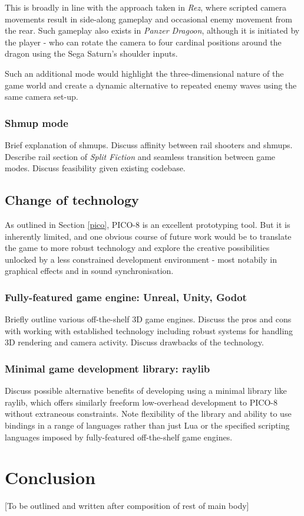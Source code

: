 \documentclass[11pt]{article}
\begin{document}
This is broadly in line with the approach taken in \textit{Rez}, where scripted camera movements
result in side-along gameplay and occasional enemy movement from the rear. Such gameplay also
exists in \textit{Panzer Dragoon}, although it is initiated by the player - who can rotate the
camera to four cardinal positions around the dragon using the Sega Saturn's shoulder inputs.

Such an additional mode would highlight the three-dimensional nature of the game world and
create a dynamic alternative to repeated enemy waves using the same camera set-up.

\subsubsection*{Shmup mode}
Brief explanation of shmups. Discuss affinity between rail shooters and shmups. Describe rail section
of \textit{Split Fiction} and seamless transition between game modes. Discuss feasibility given
existing codebase.

\subsection{Change of technology}\label{engines}

As outlined in Section \ref{pico}, PICO-8 is an excellent prototyping tool. But it is inherently
limited, and one obvious course of future work would be to translate the game to more robust technology
and explore the creative possibilities unlocked by a less constrained development environment - most
notabily in graphical effects and in sound synchronisation.

\subsubsection*{Fully-featured game engine: Unreal, Unity, Godot}
Briefly outline various off-the-shelf 3D game engines. Discuss the pros and cons with working with
established technology including robust systems for handling 3D rendering and camera activity. Discuss
drawbacks of the technology. 

\subsubsection*{Minimal game development library: raylib}
Discuss possible alternative benefits of developing using a minimal library like raylib,
which offers similarly freeform low-overhead development to PICO-8 without extraneous
constraints. Note flexibility of the library and ability to use bindings in a range of
languages rather than just Lua or the specified scripting languages imposed by fully-featured
off-the-shelf game engines.


\section{Conclusion}
[To be outlined and written after composition of rest of main body]

\printbibliography
\end{document}
